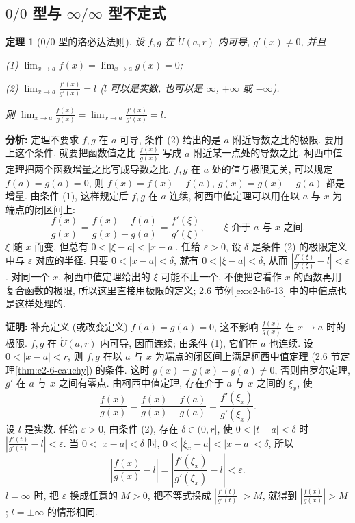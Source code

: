 \documentclass[UTF8,openany]{ctexbook}
\theoremstyle{chinesetextbook}
\newtheorem{theorem}{定理}[section]
\newenvironment{cnproof}{\par\indent\textbf{证明:} \ignorespaces}{\par}
\begin{document}
\subsection{\texorpdfstring{$0/0$ 型与 $\infty/\infty$ 型不定式}{0/0 型与 ∞/∞ 型不定式}}
\begin{theorem}[$0/0$ 型的洛必达法则]\label{thm:c2-7-lh1}
设 $f,g$ 在 $\mathring U(a,r)$ 内可导, $g'(x)\ne0$, 并且

\textup{(1)} $\displaystyle\lim_{x\to a}f(x)=\lim_{x\to a}g(x)=0$;

\textup{(2)} $\displaystyle\lim_{x\to a}\frac{f'(x)}{g'(x)}=l$ ($l$ 可以是实数, 也可以是 $\infty$, $+\infty$ 或 $-\infty$).

则 $\displaystyle\lim_{x\to a}\frac{f(x)}{g(x)}=\lim_{x\to a}\frac{f'(x)}{g'(x)}=l$.
\end{theorem}
\par\indent\textbf{分析:} 定理不要求 $f,g$ 在 $a$ 可导, 条件 (2) 给出的是 $a$ 附近导数之比的极限. 要用上这个条件, 就要把函数值之比 $\displaystyle\frac{f(x)}{g(x)}$ 写成 $a$ 附近某一点处的导数之比. 柯西中值定理把两个函数增量之比写成导数之比. $f,g$ 在 $a$ 处的值与极限无关, 可以规定 $f(a)=g(a)=0$, 则 $f(x)=f(x)-f(a)$, $g(x)=g(x)-g(a)$ 都是增量. 由条件 (1), 这样规定后 $f,g$ 在 $a$ 连续, 柯西中值定理可以用在以 $a$ 与 $x$ 为端点的闭区间上:
\[
\frac{f(x)}{g(x)}=\frac{f(x)-f(a)}{g(x)-g(a)}=\frac{f'(\xi)}{g'(\xi)},\qquad\xi\text{ 介于 }a\text{ 与 }x\text{ 之间}.
\]
$\xi$ 随 $x$ 而变, 但总有 $0<|\xi-a|<|x-a|$. 任给 $\varepsilon>0$, 设 $\delta$ 是条件 (2) 的极限定义中与 $\varepsilon$ 对应的半径. 只要 $0<|x-a|<\delta$, 就有 $0<|\xi-a|<\delta$, 从而 $\displaystyle\left|\frac{f'(\xi)}{g'(\xi)}-l\right|<\varepsilon$. 对同一个 $x$, 柯西中值定理给出的 $\xi$ 可能不止一个, 不便把它看作 $x$ 的函数再用复合函数的极限, 所以这里直接用极限的定义; 2.6 节例\ref{ex:c2-h6-13} 中的中值点也是这样处理的.
\begin{cnproof}
补充定义 (或改变定义) $f(a)=g(a)=0$, 这不影响 $\displaystyle\frac{f(x)}{g(x)}$ 在 $x\to a$ 时的极限. $f,g$ 在 $\mathring U(a,r)$ 内可导, 因而连续; 由条件 (1), 它们在 $a$ 也连续. 设 $0<|x-a|<r$, 则 $f,g$ 在以 $a$ 与 $x$ 为端点的闭区间上满足柯西中值定理 (2.6 节定理\ref{thm:c2-6-cauchy}) 的条件. 这时 $g(x)=g(x)-g(a)\ne0$, 否则由罗尔定理, $g'$ 在 $a$ 与 $x$ 之间有零点. 由柯西中值定理, 存在介于 $a$ 与 $x$ 之间的 $\xi_x$, 使
\[
\frac{f(x)}{g(x)}=\frac{f(x)-f(a)}{g(x)-g(a)}=\frac{f'(\xi_x)}{g'(\xi_x)}.
\]
设 $l$ 是实数. 任给 $\varepsilon>0$, 由条件 (2), 存在 $\delta\in(0,r]$, 使 $0<|t-a|<\delta$ 时 $\displaystyle\left|\frac{f'(t)}{g'(t)}-l\right|<\varepsilon$. 当 $0<|x-a|<\delta$ 时, $0<|\xi_x-a|<|x-a|<\delta$, 所以
\[
\left|\frac{f(x)}{g(x)}-l\right|=\left|\frac{f'(\xi_x)}{g'(\xi_x)}-l\right|<\varepsilon.
\]
$l=\infty$ 时, 把 $\varepsilon$ 换成任意的 $M>0$, 把不等式换成 $\displaystyle\left|\frac{f'(t)}{g'(t)}\right|>M$, 就得到 $\displaystyle\left|\frac{f(x)}{g(x)}\right|>M$; $l=\pm\infty$ 的情形相同.
\end{cnproof}
\end{document}

